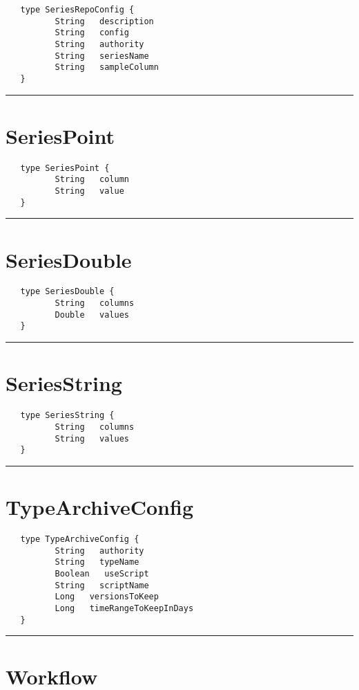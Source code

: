 \begin{verbatim}
   type SeriesRepoConfig {
          String   description
          String   config
          String   authority
          String   seriesName
          String   sampleColumn
   }
\end{verbatim}

\rule{15cm}{2pt}
\section{SeriesPoint}
\label{type:SeriesPoint}

\begin{verbatim}
   type SeriesPoint {
          String   column
          String   value
   }
\end{verbatim}

\rule{15cm}{2pt}
\section{SeriesDouble}
\label{type:SeriesDouble}

\begin{verbatim}
   type SeriesDouble {
          String   columns
          Double   values
   }
\end{verbatim}

\rule{15cm}{2pt}
\section{SeriesString}
\label{type:SeriesString}

\begin{verbatim}
   type SeriesString {
          String   columns
          String   values
   }
\end{verbatim}

\rule{15cm}{2pt}
\section{TypeArchiveConfig}
\label{type:TypeArchiveConfig}

\begin{verbatim}
   type TypeArchiveConfig {
          String   authority
          String   typeName
          Boolean   useScript
          String   scriptName
          Long   versionsToKeep
          Long   timeRangeToKeepInDays
   }
\end{verbatim}

\rule{15cm}{2pt}
\section{Workflow}
\label{type:Workflow}

